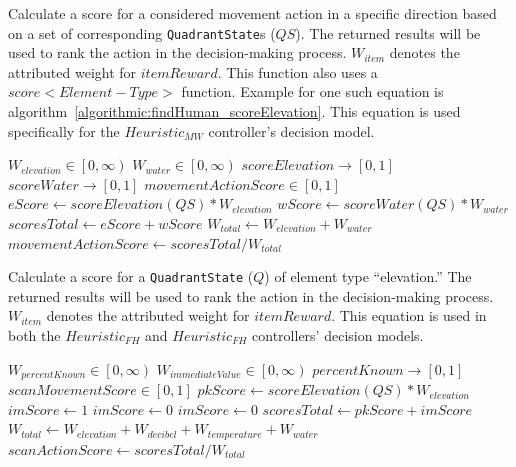 \begin{algorithm}[!htb]
  \caption[Heuristic - Score Potential Movement Action (Map Water)]{Calculate a score for a considered movement action in a specific direction based on a set of corresponding \texttt{QuadrantState}s ($QS$). The returned results will be used to rank the action in the decision-making process. $W_{item}$ denotes the attributed weight for $itemReward$. This function also uses a $score<Element-Type>$ function. Example for one such equation is algorithm~\ref{algorithmic:findHuman_scoreElevation}. This equation is used specifically for the $Heuristic_{MW}$ controller's decision model.}
  \begin{algorithmic} \label{algorithmic:mapWater_scoreMovementAction}
    \REQUIRE $W_{elevation} \in \left[0, \infty \right)$
    \REQUIRE $W_{water} \in \left[0, \infty \right)$
    \ENSURE $scoreElevation \rightarrow \left[0, 1 \right]$
    \ENSURE $scoreWater \rightarrow \left[0, 1 \right]$
    \ENSURE $movementActionScore \in \left[0, 1 \right]$
    \STATE $eScore \leftarrow scoreElevation(QS) * W_{elevation}$
    \STATE $wScore \leftarrow scoreWater(QS) * W_{water}$
    \STATE $scoresTotal \leftarrow eScore + wScore$
    \STATE $W_{total} \leftarrow W_{elevation} + W_{water}$
    \RETURN $movementActionScore \leftarrow scoresTotal / W_{total}$
  \end{algorithmic}
\end{algorithm}


\begin{algorithm}[!htb]
  \caption[Heuristic - Score Quadrant (Elevation)]{Calculate a score for a \texttt{QuadrantState} ($Q$) of element type ``elevation.'' The returned results will be used to rank the action in the decision-making process. $W_{item}$ denotes the attributed weight for $itemReward$. This equation is used in both the $Heuristic_{FH}$ and $Heuristic_{FH}$ controllers' decision models.}
  \begin{algorithmic} \label{algorithmic:findHuman_scoreElevation}
    \REQUIRE $W_{percentKnown} \in \left[0, \infty \right)$
    \REQUIRE $W_{immediateValue} \in \left[0, \infty \right)$
    \ENSURE $percentKnown \rightarrow \left[0, 1 \right]$
    \ENSURE $scanMovementScore \in \left[0, 1 \right]$
    \STATE $pkScore \leftarrow scoreElevation(QS) * W_{elevation}$
        \STATE $imScore \leftarrow 1$
      \ELSE
        \STATE $imScore \leftarrow 0$
      \ENDIF
    \ELSE
      \STATE $imScore \leftarrow 0$
    \ENDIF
    \STATE $scoresTotal \leftarrow pkScore + imScore$
    \STATE $W_{total} \leftarrow W_{elevation} + W_{decibel} + W_{temperature} + W_{water}$
    \RETURN $scanActionScore \leftarrow scoresTotal / W_{total}$
  \end{algorithmic}
\end{algorithm}



